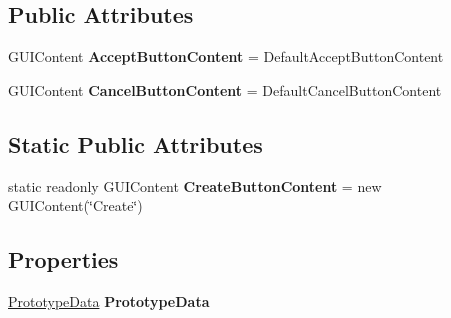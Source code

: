 \subsection*{Public Attributes}
\begin{DoxyCompactItemize}
\item 
\hypertarget{class_hattori_game2_1_1_prototyping_1_1_prototype_details_window_a6eb236dd8a03c7624d19b572ab959964}{}G\+U\+I\+Content {\bfseries Accept\+Button\+Content} = Default\+Accept\+Button\+Content\label{class_hattori_game2_1_1_prototyping_1_1_prototype_details_window_a6eb236dd8a03c7624d19b572ab959964}

\item 
\hypertarget{class_hattori_game2_1_1_prototyping_1_1_prototype_details_window_a446e705b0e23a2acddc17a1f942a206a}{}G\+U\+I\+Content {\bfseries Cancel\+Button\+Content} = Default\+Cancel\+Button\+Content\label{class_hattori_game2_1_1_prototyping_1_1_prototype_details_window_a446e705b0e23a2acddc17a1f942a206a}

\end{DoxyCompactItemize}
\subsection*{Static Public Attributes}
\begin{DoxyCompactItemize}
\item 
\hypertarget{class_hattori_game2_1_1_prototyping_1_1_prototype_details_window_ac633b5cc95428f47fdd0bf28beb334f4}{}static readonly G\+U\+I\+Content {\bfseries Create\+Button\+Content} = new G\+U\+I\+Content(\char`\"{}Create\char`\"{})\label{class_hattori_game2_1_1_prototyping_1_1_prototype_details_window_ac633b5cc95428f47fdd0bf28beb334f4}

\end{DoxyCompactItemize}
\subsection*{Properties}
\begin{DoxyCompactItemize}
\item 
\hypertarget{class_hattori_game2_1_1_prototyping_1_1_prototype_details_window_af89baa575e02b8263e9bf0ca157f2a6c}{}\hyperlink{class_hattori_game2_1_1_prototyping_1_1_prototype_data}{Prototype\+Data} {\bfseries Prototype\+Data}\label{class_hattori_game2_1_1_prototyping_1_1_prototype_details_window_af89baa575e02b8263e9bf0ca157f2a6c}

\end{DoxyCompactItemize}
